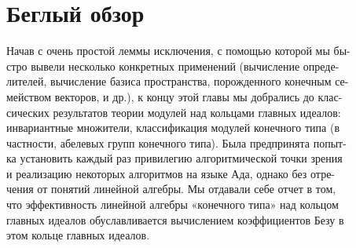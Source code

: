 




%


\pagebreak

\sectiontop
\section{Беглый обзор} 

\medskip

\noindent  Начав с очень простой леммы исключения, с помощью которой мы 
бы-\\стро вывели несколько конкретных применений (вычисление 
опреде-\\лителей, вычисление базиса пространства, порожденного конечным 
се-\\мейством векторов, и др.), к концу этой главы мы добрались до 
клас-\\сических результатов теории модулей над кольцами главных идеалов: \\
инвариантные множители, классификация модулей конечного типа (в\\ 
частности, абелевых групп конечного типа). Была предпринята 
попыт-\\ка установить каждый раз привилегию алгоритмической точки зрения\\ 
и реализацию некоторых алгоритмов на языке Ада, однако без 
отре-\\чения от понятий линейной алгебры. Мы отдавали себе отчет в том,\\
что эффективность линейной алгебры «конечного типа» над кольцом\\ 
главных идеалов обуславливается вычислением коэффициентов Безу в\\ 
этом кольце главных идеалов. 


